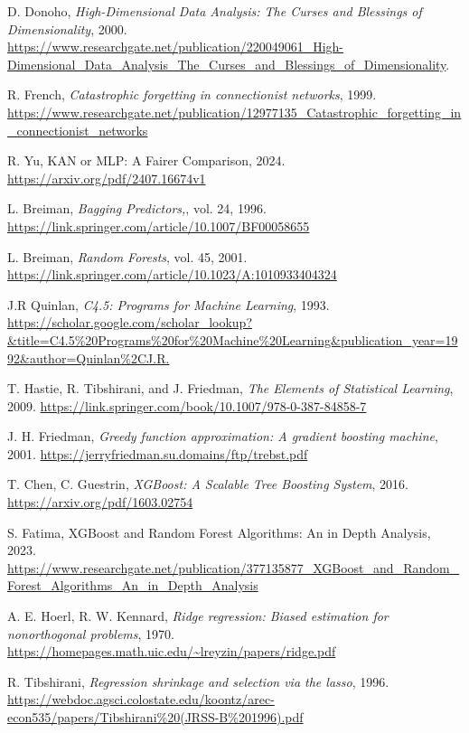 \documentclass[a4paper,12pt]{report}
\begin{document}
\begin{thebibliography}{99}
		D. Donoho, \emph{High-Dimensional Data Analysis: The Curses and Blessings of Dimensionality}, 2000. \url{https://www.researchgate.net/publication/220049061_High-Dimensional_Data_Analysis_The_Curses_and_Blessings_of_Dimensionality}.
		
		R. French, \emph{Catastrophic forgetting in connectionist networks}, 1999. \url{https://www.researchgate.net/publication/12977135_Catastrophic_forgetting_in_connectionist_networks}
		
		R. Yu, KAN or MLP: A Fairer Comparison, 2024. \url{https://arxiv.org/pdf/2407.16674v1}
		
		L. Breiman, \emph{Bagging Predictors,}, vol. 24, 1996. \url{https://link.springer.com/article/10.1007/BF00058655}
		
		L. Breiman, \emph{Random Forests}, vol. 45, 2001. \url{https://link.springer.com/article/10.1023/A:1010933404324}
		
		J.R Quinlan, \emph{C4.5: Programs for Machine Learning}, 1993. \url{https://scholar.google.com/scholar_lookup?&title=C4.5%20Programs%20for%20Machine%20Learning&publication_year=1992&author=Quinlan%2CJ.R.}
		
		T. Hastie, R. Tibshirani, and J. Friedman, \emph{The Elements of Statistical Learning}, 2009. \url{https://link.springer.com/book/10.1007/978-0-387-84858-7}
		
		J. H. Friedman, \emph{Greedy function approximation: A gradient boosting machine}, 2001. \url{https://jerryfriedman.su.domains/ftp/trebst.pdf}
		
		T. Chen, C. Guestrin, \emph{XGBoost: A Scalable Tree Boosting System}, 2016. \url{https://arxiv.org/pdf/1603.02754}
		
		S. Fatima, XGBoost and Random Forest Algorithms: An in Depth Analysis, 2023. \url{https://www.researchgate.net/publication/377135877_XGBoost_and_Random_Forest_Algorithms_An_in_Depth_Analysis}
		
		A. E. Hoerl, R. W. Kennard, \emph{Ridge regression: Biased estimation for nonorthogonal problems}, 1970. \url{https://homepages.math.uic.edu/~lreyzin/papers/ridge.pdf}
		
		R. Tibshirani, \emph{Regression shrinkage and selection via the lasso}, 1996. \url{https://webdoc.agsci.colostate.edu/koontz/arec-econ535/papers/Tibshirani%20(JRSS-B%201996).pdf}
		

\end{thebibliography}
\end{document}
